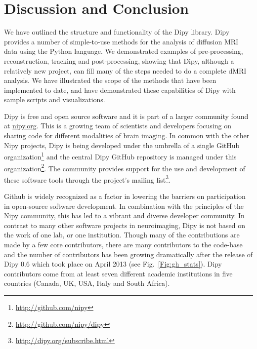 \documentclass{bioinfo}
\begin{document}
\section{Discussion and Conclusion}

We have outlined the structure and functionality of the Dipy library.  Dipy
provides a number of simple-to-use methods for the analysis of diffusion MRI data using the Python
language. We demonstrated examples of pre-processing, reconstruction, tracking and post-processing,
showing that Dipy, although a relatively new project, can fill many of the steps needed to do a complete
dMRI analysis. We have illustrated the scope of the methods that have been implemented to date, and have
demonstrated these capabilities of Dipy with sample scripts and visualizations.

Dipy is free and open source software and it is part of a larger community found at \url{nipy.org}.
This is a growing team of scientists and developers focusing on sharing code for different modalities
of brain imaging. In common with the other Nipy projects, Dipy is being developed under the
umbrella of a single GitHub organization\footnote{\url{http://github.com/nipy}} and the central
Dipy GitHub repository is managed under this organization\footnote{\url{http://github.com/nipy/dipy}}.
The community provides support for the use and development of these software tools through
the project's mailing list\footnote{\url{http://dipy.org/subscribe.html}}.

Github is widely recognized as a factor in lowering the barriers on
participation in open-source software development. In combination with
the principles of the Nipy community, this has led to a vibrant and diverse
developer community. In contrast to many other software projects in
neuroimaging, Dipy is not based on the work of one lab, or one institution. Though
many of the contributions are made by a few core contributors, there are many
contributors to the code-base and the number of contributors has been growing
dramatically after the release of Dipy 0.6 which took place on April 2013 (see
Fig.~\ref{Fig:gh_stats}).
Dipy contributors come from at least seven different academic
institutions in five countries (Canada, UK, USA, Italy and South Africa).
\end{document}
